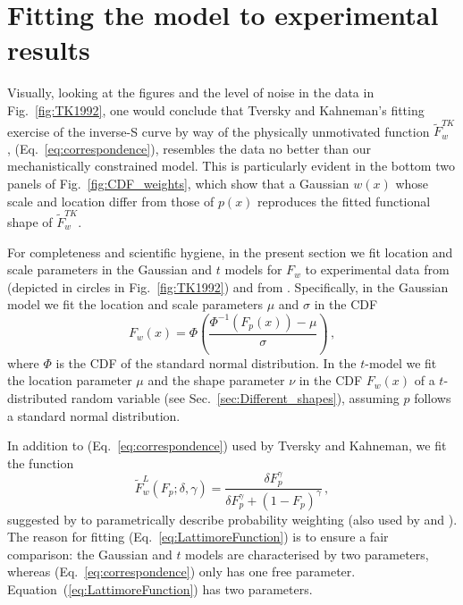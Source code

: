 \documentclass[a4paper, 12pt]{article}
\newcommand{\elabel}[1]{\label{eq:#1}}
\newcommand{\eref}[1]{(Eq.~\ref{eq:#1})}
\newcommand{\Eref}[1]{Equation~(\ref{eq:#1})}
\newcommand{\fref}[1]{Fig.~\ref{fig:#1}}
\newcommand{\seclabel}[1]{\label{sec:#1}}
\newcommand{\secref}[1]{Sec.~\ref{sec:#1}}
\newcommand{\be}{\begin{equation}}
\newcommand{\ee}{\end{equation}}
\begin{document}
\section{Fitting the model to experimental results \seclabel{Fitting_the}}

Visually, looking at the figures and the level of noise in the data in \fref{TK1992}, one would conclude that Tversky and Kahneman's fitting exercise of the inverse-S curve by way of the physically unmotivated function $\tilde{F}^{TK}_w$, \eref{correspondence}, resembles the data no better than our mechanistically constrained model. This is particularly evident in the bottom two panels of \fref{CDF_weights}, which show that a Gaussian $w(x)$ whose scale and location differ from those of $p(x)$ reproduces the fitted functional shape of $\tilde{F}^{TK}_w$.

For completeness and scientific hygiene, in the present section we fit location and scale parameters in the Gaussian and $t$ models for $F_w$ to experimental data from \cite{TverskyKahneman1992} (depicted in circles in \fref{TK1992}) and from \cite{TverskyFox1995}. Specifically, in the Gaussian model we fit the location and scale parameters $\mu$ and $\sigma$ in the CDF
%
\be
F_w\left(x\right) = \Phi\left(\frac{\Phi^{-1}\left(F_p\left(x\right)\right) - \mu}{\sigma}\right)\,,
\ee
%
where $\Phi$ is the CDF of the standard normal distribution. In the $t$-model we fit the location parameter $\mu$ and the shape parameter $\nu$ in the CDF $F_w\left(x\right)$ of a $t$-distributed random variable (see \secref{Different_shapes}), assuming $p$ follows a standard normal distribution.


In addition to \eref{correspondence} used by Tversky and Kahneman, we fit the function
%
\be
\tilde{F}^{L}_w\left(F_p; \delta,\gamma\right) =\frac{\delta F_p^{\gamma}}{\delta F_p^{\gamma} + \left(1-F_p\right)^{\gamma}}\,,
\elabel{LattimoreFunction}
\ee
%
suggested by \cite{LattimoreBakerWitte1992} to parametrically describe probability weighting (also used by \cite{tversky1995risk} and \cite{Prelec1998}). The reason for fitting \eref{LattimoreFunction} is to ensure a fair comparison: the Gaussian and $t$ models are characterised by two parameters, whereas \eref{correspondence} only has one free parameter. \Eref{LattimoreFunction} has two parameters.
\end{document}
